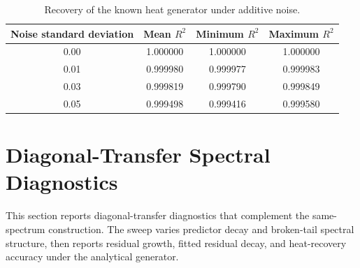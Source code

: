 \documentclass{article}
\begin{document}
\begin{table}[H]
\centering
\caption{Recovery of the known heat generator under additive noise.}
\label{tab:supp-heat-noise}
\begin{tabular}{cccc}
\toprule
Noise standard deviation & Mean $R^2$ & Minimum $R^2$ & Maximum $R^2$ \\
\midrule
0.00 & 1.000000 & 1.000000 & 1.000000 \\
0.01 & 0.999980 & 0.999977 & 0.999983 \\
0.03 & 0.999819 & 0.999790 & 0.999849 \\
0.05 & 0.999498 & 0.999416 & 0.999580 \\
\bottomrule
\end{tabular}
\end{table}

\section{Diagonal-Transfer Spectral Diagnostics}
\label{sec:supp-rich}

This section reports diagonal-transfer diagnostics that complement the same-spectrum construction. The sweep varies predictor decay and broken-tail spectral structure, then reports residual growth, fitted residual decay, and heat-recovery accuracy under the analytical generator.

\begin{table}[H]
\centering
\caption{Diagonal-transfer spectral diagnostics. Rows vary predictor decay or introduce broken-tail spectral structure under the analytical generator.}
\label{tab:supp-earlier}
\small
\setlength{\tabcolsep}{3pt}
\end{table}
\end{document}

